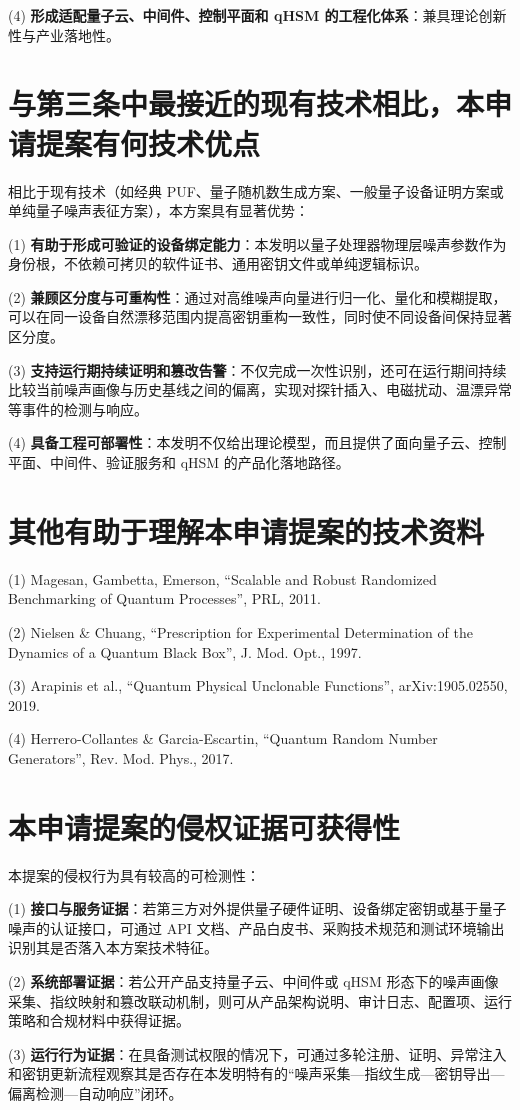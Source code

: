 \documentclass[12pt,a4paper]{article}
\begin{document}
(4) \textbf{形成适配量子云、中间件、控制平面和 qHSM 的工程化体系}：兼具理论创新性与产业落地性。

\section{与第三条中最接近的现有技术相比，本申请提案有何技术优点}

相比于现有技术（如经典 PUF、量子随机数生成方案、一般量子设备证明方案或单纯量子噪声表征方案），本方案具有显著优势：

(1) \textbf{有助于形成可验证的设备绑定能力}：本发明以量子处理器物理层噪声参数作为身份根，不依赖可拷贝的软件证书、通用密钥文件或单纯逻辑标识。

(2) \textbf{兼顾区分度与可重构性}：通过对高维噪声向量进行归一化、量化和模糊提取，可以在同一设备自然漂移范围内提高密钥重构一致性，同时使不同设备间保持显著区分度。

(3) \textbf{支持运行期持续证明和篡改告警}：不仅完成一次性识别，还可在运行期间持续比较当前噪声画像与历史基线之间的偏离，实现对探针插入、电磁扰动、温漂异常等事件的检测与响应。

(4) \textbf{具备工程可部署性}：本发明不仅给出理论模型，而且提供了面向量子云、控制平面、中间件、验证服务和 qHSM 的产品化落地路径。

\section{其他有助于理解本申请提案的技术资料}

(1) Magesan, Gambetta, Emerson, ``Scalable and Robust Randomized Benchmarking of Quantum Processes'', PRL, 2011.

(2) Nielsen \& Chuang, ``Prescription for Experimental Determination of the Dynamics of a Quantum Black Box'', J. Mod. Opt., 1997.

(3) Arapinis et al., ``Quantum Physical Unclonable Functions'', arXiv:1905.02550, 2019.

(4) Herrero-Collantes \& Garcia-Escartin, ``Quantum Random Number Generators'', Rev. Mod. Phys., 2017.

\section{本申请提案的侵权证据可获得性}

本提案的侵权行为具有较高的可检测性：

(1) \textbf{接口与服务证据}：若第三方对外提供量子硬件证明、设备绑定密钥或基于量子噪声的认证接口，可通过 API 文档、产品白皮书、采购技术规范和测试环境输出识别其是否落入本方案技术特征。

(2) \textbf{系统部署证据}：若公开产品支持量子云、中间件或 qHSM 形态下的噪声画像采集、指纹映射和篡改联动机制，则可从产品架构说明、审计日志、配置项、运行策略和合规材料中获得证据。

(3) \textbf{运行行为证据}：在具备测试权限的情况下，可通过多轮注册、证明、异常注入和密钥更新流程观察其是否存在本发明特有的“噪声采集—指纹生成—密钥导出—偏离检测—自动响应”闭环。
\end{document}

